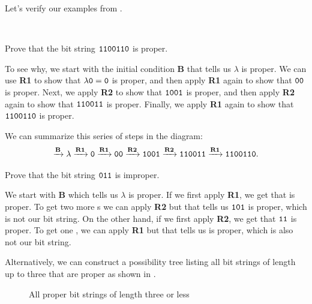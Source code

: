 Let's verify our examples from .

\begin{exam}
\label{exam_proper_bs}
~
    \begin{apart}
        \item \label{part_bs_is_proper} Prove that the bit string $\texttt{1100110}$ is proper.
            \begin{soln}
                To see why, we start with the initial condition \textbf{B} that tells us $\lambda$ is proper.  We can use \textbf{R1} to show that $\lambda\texttt{0} = \texttt{0}$ is proper, and then apply \textbf{R1} again to show that $\texttt{00}$ is proper.  Next, we apply \textbf{R2} to show that $\texttt{1001}$ is proper, and then apply \textbf{R2} again to show that $\texttt{110011}$ is proper.  Finally, we apply \textbf{R1} again to show that $\texttt{1100110}$ is proper. 

                We can summarize this series of steps in the diagram: 
                $$ 
                \xrightarrow{\textbf{B}} \lambda \xrightarrow{\textbf{R1}} \texttt{0} \xrightarrow{\textbf{R1}} \texttt{00} \xrightarrow{\textbf{R2}} \texttt{1001} \xrightarrow{\textbf{R2}} \texttt{110011} \xrightarrow{\textbf{R1}} \texttt{1100110}.$$
            \end{soln}
        \item \label{part_bs_is_improper}  Prove that the bit string $\texttt{011}$ is improper.
            \begin{soln}
                We start with \textbf{B} which tells us $\lambda$ is proper.  If we first apply \textbf{R1}, we get that  is proper.  To get two more s we can apply \textbf{R2} but that tells us $\texttt{101}$ is proper, which is not our bit string.  On the other hand, if we first apply \textbf{R2}, we get that $\texttt{11}$ is proper.  To get one , we can apply \textbf{R1} but that tells us  is proper, which is also not our bit string.

                Alternatively, we can construct a possibility tree listing all bit strings of length up to three that are proper as shown in .
            \end{soln}
            \begin{figure}[hbtp]
                \centering
                
                \caption{All proper bit strings of length three or less}
                \label{fig_tree_proper_bs3}
            \end{figure}
    \end{apart}
\end{exam}

